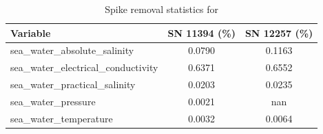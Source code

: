 \begin{table}[h]
\centering
\caption{Spike removal statistics for \projectname{} \casenumber{}}
\label{tab:str15_spike_stats}
\begin{tabular}{|l|c|c|}
\hline
Variable & SN 11394 (\%) & SN 12257 (\%) \\
\hline
sea\_water\_absolute\_salinity & 0.0790 & 0.1163 \\
sea\_water\_electrical\_conductivity & 0.6371 & 0.6552 \\
sea\_water\_practical\_salinity & 0.0203 & 0.0235 \\
sea\_water\_pressure & 0.0021 & nan \\
sea\_water\_temperature & 0.0032 & 0.0064 \\
\hline
\end{tabular}
\end{table}
